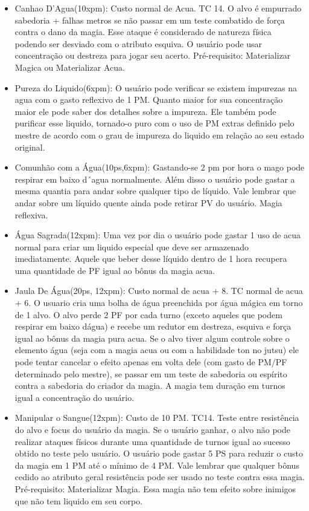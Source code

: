 \begin{itemize}
	\item Canhao D'Agua(10xpm): Custo normal de Acua. TC 14.\newline 
O alvo é empurrado sabedoria + falhas metros se não passar em um teste combatido de força contra o dano da magia. Esse ataque é considerado de natureza física podendo ser desviado com o atributo esquiva. O usuário pode usar concentração ou destreza para jogar seu acerto. Pré-requisito: Materializar Magica ou Materializar Acua.

	\item Pureza do Liquido(6xpm): O usuário pode verificar se existem impurezas na agua com o gasto reflexivo de 1 PM. Quanto maior for sua concentração maior ele pode saber dos detalhes sobre a impureza. Ele também pode purificar esse liquido, tornado-o puro com o uso de PM extras definido pelo mestre de acordo com o grau de impureza do liquido em relação ao seu estado original.

	\item Comunhão com a Água(10ps,6xpm): Gastando-se 2 pm por hora o mago pode respirar em baixo d´agua normalmente. Além disso o usuário pode gastar a mesma quantia para andar sobre qualquer tipo de líquido. Vale lembrar que andar sobre um líquido quente ainda pode retirar PV do usuário. Magia reflexiva.

	\item Água Sagrada(12xpm): Uma vez por dia o usuário pode gastar 1 uso de acua normal para criar um liquido especial que deve ser armazenado imediatamente. Aquele que beber desse líquido dentro de 1 hora recupera uma quantidade de PF igual ao bônus da magia acua.
	
\item Jaula De Água(20ps, 12xpm): Custo normal de acua + 8. TC normal de acua + 6.\newline
O usuario cria uma bolha de água preenchida por água mágica em torno de 1 alvo. O alvo perde 2 PF por cada turno (exceto aqueles que podem respirar em baixo dágua) e recebe um redutor em destreza, esquiva e força igual ao bônus da magia pura acua. Se o alvo tiver algum controle sobre o elemento água (seja com a magia acua ou com a habilidade ton no jutsu) ele pode tentar cancelar o efeito apenas em volta dele (com gasto de PM/PF determinado pelo mestre), se passar em um teste de sabedoria ou espírito contra a sabedoria do criador da magia. A magia tem duração em turnos igual a concentração do usuário.

	\item Manipular o Sangue(12xpm): Custo de 10 PM. TC14.\newline
Teste entre resistência do alvo e focus do usuário da magia. Se o usuário ganhar, o alvo não pode realizar ataques físicos durante uma quantidade de turnos igual ao sucesso obtido no teste pelo usuário. O usuário pode gastar 5 PS para reduzir o custo da magia em 1 PM até o mínimo de 4 PM. Vale lembrar que qualquer bônus cedido ao atributo geral resistência pode ser usado no teste contra essa magia. Pré-requisito: Materializar Magia. Essa magia não tem efeito sobre inimigos que não tem liquido em seu corpo.
	
	
\end{itemize}

